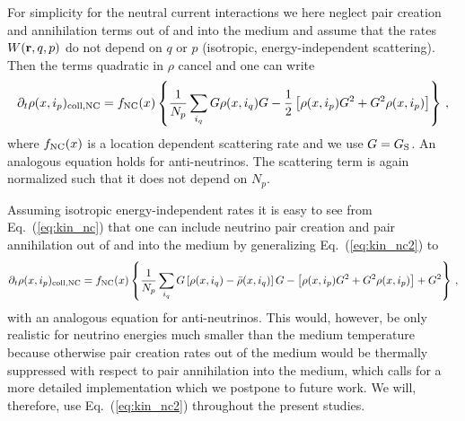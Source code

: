 \documentclass[prd,aps]{revtex4-2}
\begin{document}
For simplicity for the neutral current interactions
we here neglect pair creation and annihilation terms out of and into the medium and assume that the rates
$W({\bf r},q,p)$ do not depend on $q$ or $p$
(isotropic, energy-independent scattering). Then the terms quadratic in $\rho$ cancel and one can write
\begin{equation}\label{eq:kin_nc2}
\partial_t\rho(x,i_p)_{\rm coll,NC}=f_{\rm NC}(x)\left\{
  \frac{1}{N_p}\sum_{i_q}G\rho(x,i_q)G-\frac{1}{2}\left[\rho(x,i_p)G^2+G^2\rho(x,i_p)\right]\right\}\,,
\end{equation}
where $f_{\rm NC}(x)$ is a location dependent scattering rate and we use $G=G_{\rm S}$. An analogous equation
holds for anti-neutrinos. The scattering term is again normalized such that it does not depend on $N_p$.

Assuming isotropic energy-independent rates it is easy to see from Eq.~(\ref{eq:kin_nc}) that one can include neutrino
pair creation and pair annihilation out of and into the medium by generalizing Eq.~(\ref{eq:kin_nc2}) to
\begin{equation}\label{eq:kin_nc3}
\partial_t\rho(x,i_p)_{\rm coll,NC}=f_{\rm NC}(x)\left\{
   \frac{1}{N_p}\sum_{i_q}G\left[\rho(x,i_q)-\bar\rho(x,i_q)\right]G-\left[\rho(x,i_p)G^2+G^2\rho(x,i_p)\right]+G^2\right\}\,,
\end{equation}
with an analogous equation for anti-neutrinos. This would, however, be only realistic for neutrino energies much smaller
than the medium temperature because otherwise pair creation rates out of the medium would be thermally suppressed
with respect to pair annihilation into the medium, which calls for a more detailed implementation which we postpone to future work.
We will, therefore, use Eq.~(\ref{eq:kin_nc2}) throughout the present studies.
\end{document}
